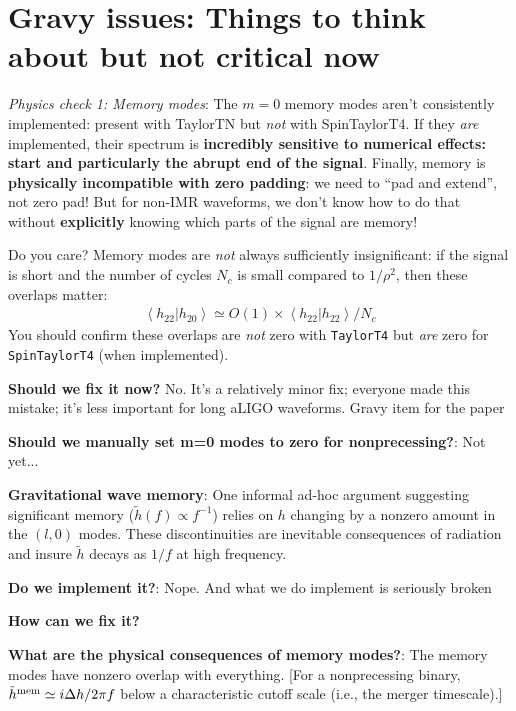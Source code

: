 \documentclass[twocolumn,prd,nofootinbib]{revtex4}
\newcommand\editremark[1]{{\color{red} #1}}
\newcommand\qmstateproduct[2]{\left\langle#1|#2\right\rangle}
\begin{document}
\appendix
\section{Gravy issues: Things to think about but not critical now}

\emph{Physics check 1: Memory modes}: The $m=0$ memory modes \cite{2009PhRvD..80b4002F,2009ApJ...696L.159F,2010CQGra..27h4036F,2011PhRvD..84l4013F} aren't consistently implemented: present with
  TaylorTN but \emph{not} with SpinTaylorT4.   If they \emph{are}
  implemented, their spectrum is \textbf{incredibly sensitive to numerical effects: start and particularly the abrupt
    end of the signal}.  Finally, memory is \textbf{physically incompatible with zero padding}: we need to ``pad and
  extend'', not zero pad!    But for non-IMR waveforms, we don't know how to do that without \textbf{explicitly} knowing
  which parts of the signal are memory!

Do you care?  Memory modes are \emph{not} always sufficiently insignificant: if the signal is short and the number of cycles
$N_{c}$ is small compared to $1/\rho^2$, then these overlaps matter:
\begin{eqnarray}
\qmstateproduct{h_{22}}{h_{20}} \simeq O(1) \times \qmstateproduct{h_{22}}{h_{22}}/N_c 
\end{eqnarray}
You should confirm these overlaps are \emph{not} zero with \texttt{TaylorT4} but \emph{are} zero for
\texttt{SpinTaylorT4} (when implemented).

\textbf{Should we fix it now?} No.  It's a relatively minor fix; everyone made this mistake; it's less important for
long aLIGO waveforms. \editremark{Gravy item for the paper}

\textbf{Should we manually set m=0 modes to zero for nonprecessing?}: Not yet...

\begin{shaded}
\noindent \textbf{Gravitational wave memory}: One informal   ad-hoc argument suggesting significant memory ($\tilde{h}(f)\propto f^{-1}$)
  relies on $h$ changing by a nonzero amount in the $(l,0)$ modes.    These discontinuities are inevitable consequences
  of radiation and insure $\tilde{h}$ decays as $1/f$ at high frequency.

\noindent \textbf{Do we implement it?}: Nope.  And what we do implement is seriously broken

\noindent \textbf{How can we fix it?}

\noindent \textbf{What are the physical consequences of memory modes?}: The memory modes have nonzero overlap with
everything. [For a nonprecessing binary, $\tilde{h}^{\rm mem} \simeq i \Delta h/2\pi f$ below a characteristic cutoff
scale (i.e., the merger timescale).]
\end{shaded}
\end{document}
